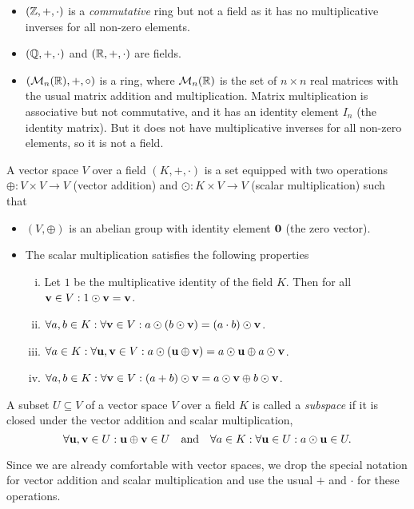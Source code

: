 \begin{itemize}
    \item \((\mathbb Z, +, \cdot)\) is a \emph{commutative} ring but not a field as it has no multiplicative inverses for all non-zero elements.
    \item \((\mathbb Q, +, \cdot)\) and \((\mathbb R, +, \cdot)\) are fields.
    \item \((\mathcal M_{n}(\mathbb R), +, \circ)\) is a ring, where \(\mathcal M_{n}(\mathbb R)\) is the set of \(n \times n\) real matrices with the usual matrix addition and multiplication. Matrix multiplication is associative but not commutative, and it has an identity element \(I_n\) (the identity matrix). But it does not have multiplicative inverses for all non-zero elements, so it is not a field.
\end{itemize}

\begin{definition}
    A vector space \(V\) over a field \((K, +, \cdot)\) is a set equipped with two operations \(\oplus: V \times V \to V\) (vector addition) and \(\odot: K \times V \to V\) (scalar multiplication) such that
    \begin{itemize}
        \item \((V, \oplus)\) is an abelian group with identity element \(\vb{0}\) (the zero vector).
        \item The scalar multiplication satisfies the following properties
              \begin{enumerate}[(i)]
                  \item Let \(1\) be the multiplicative identity of the field \(K\). Then for all \(\vb{v} \in V: 1 \odot \vb{v} = \vb{v}\).
                  \item \(\forall a, b \in K: \forall \vb{v} \in V: a \odot (b \odot \vb{v}) = (a \cdot b) \odot \vb{v}\).
                  \item \(\forall a \in K: \forall \vb{u}, \vb{v} \in V: a \odot (\vb{u} \oplus \vb{v}) = a \odot \vb{u} \oplus a \odot \vb{v}\).
                  \item \(\forall a, b \in K: \forall \vb{v} \in V: (a + b) \odot \vb{v} = a \odot \vb{v} \oplus b \odot \vb{v}\).
              \end{enumerate}
    \end{itemize}
\end{definition}

\begin{definition}
    A subset \(U \subseteq V\) of a vector space \(V\) over a field \(K\) is called a \emph{subspace} if it is closed under the vector addition and scalar multiplication, \ie\
    \begin{equation}
        \forall \vb{u}, \vb{v} \in U: \vb{u} \oplus \vb{v} \in U \quad \text{and} \quad \forall a \in K: \forall \vb{u} \in U: a \odot \vb{u} \in U.
    \end{equation}
\end{definition}
Since we are already comfortable with vector spaces, we drop the special notation for vector addition and scalar multiplication and use the usual \(+\) and \(\cdot\) for these operations.

